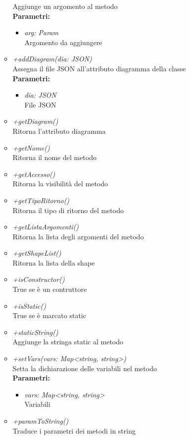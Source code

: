 \begin{itemize}
\begin{itemize}
    		Aggiunge un argomento al metodo\\
    		\textbf{Parametri:}
    		\begin{itemize}
    			\item \emph{arg: Param}\\
    			Argomento da aggiungere
    		\end{itemize}
    		\item \emph{+addDiagram(dia: JSON)}\\
    		Assegna il file JSON all'attributo diagramma della classe\\
    		\textbf{Parametri:}
    		\begin{itemize}
    			\item \emph{dia: JSON}\\
    			File JSON
    		\end{itemize}
    		\item \emph{+getDiagram()}\\
    		Ritorna l'attributo diagramma
    		\item \emph{+getNome()}\\
    		Ritorna il nome del metodo
    		\item \emph{+getAccesso()}\\
    		Ritorna la visibilità del metodo
    		\item \emph{+getTipoRitorno()}\\
    		Ritorna il tipo di ritorno del metodo
    		\item \emph{+getListaArgomenti()}\\
    		Ritorna la lista degli argomenti del metodo
    		\item \emph{+getShapeList()}\\
    		Ritorna la lista della shape
    		\item \emph{+isConstructor()}\\
    		True se è un contruttore
    		\item \emph{+isStatic()}\\
    		True se è marcato static
    		\item \emph{+staticString()}\\
    		Aggiunge la stringa static al metodo
    		\item \emph{+setVars(vars: Map<string, string>)}\\
    		Setta la dichiarazione delle variabili nel metodo\\
    		\textbf{Parametri:}
    		\begin{itemize}
    			\item \emph{vars: Map<string, string>}\\
    			Variabili
    		\end{itemize}
    		\item \emph{+paramToString()}\\
    		Traduce i parametri dei metodi in string
    	\end{itemize}
\end{itemize}